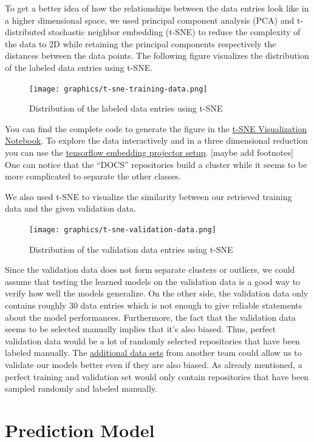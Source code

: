 \documentclass{article}
\begin{document}
To get a better idea of how the relationships between the data entries
look like in a higher dimensional space, we used principal component
analysis (PCA) and t-distributed stochastic neighbor embedding (t-SNE)
to reduce the complexity of the data to 2D while retaining the principal
components respectively the distances between the data points. The
following figure visualizes the distribution of the labeled data entries
using t-SNE.
\begin{figure}
\centering
\texttt{[image: graphics/t-sne-training-data.png]}
\caption{Distribution of the labeled data entries using t-SNE}
\end{figure}
You can find the complete code to generate the figure in the
\href{https://github.com/WGierke/git_better/blob/master/t-SNE\%20Visualization.ipynb}{t-SNE
Visualization Notebook}. To explore the data interactively and in a
three dimensional reduction you can use the
\href{https://github.com/WGierke/git_better\#usage}{tensorflow embedding
projector setup}. {[}maybe add footnotes{]} One can notice that the
``DOCS'' repositories build a cluster while it seems to be more
complicated to separate the other classes.

We also used t-SNE to visualize the similarity between our retrieved
training data and the given validation data.
\begin{figure}
\centering
\texttt{[image: graphics/t-sne-validation-data.png]}
\caption{Distribution of the validation data entries using t-SNE}
\end{figure}

Since the validation data does not form separate clusters or outliers,
we could assume that testing the learned models on the validation data
is a good way to verify how well the models generalize. On the other
side, the validation data only contains roughly 30 data entries which is
not enough to give reliable statements about the model performances.
Furthermore, the fact that the validation data seems to be selected
manually implies that it's also biased. Thus, perfect validation data
would be a lot of randomly selected repositories that have been labeled
manually. The
\href{https://github.com/InformatiCup/InformatiCup2017/tree/master/additional_data_sets}{additional
data sets} from another team could allow us to validate our models
better even if they are also biased. As already mentioned, a perfect
training and validation set would only contain repositories that have
been sampled randomly and labeled manually.

\section{Prediction Model}\label{prediction-model}
\end{document}
